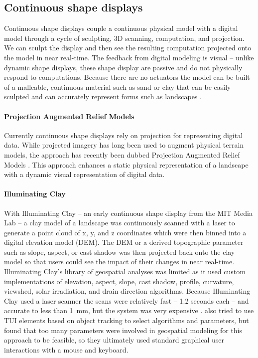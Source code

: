 \documentclass{article}
\begin{document}
%
\subsection{Continuous shape displays} 
Continuous shape displays couple a continuous physical model
with a digital model through a cycle of sculpting, 3D scanning, computation, and projection.
We can sculpt the display and then see the resulting computation projected onto the model
in near real-time. The feedback from digital modeling is visual -- unlike dynamic shape displays,
these shape display are passive and do not physically respond to computations.
Because there are no actuators the model can be built of a malleable, continuous material
such as sand or clay that can be easily sculpted and can accurately represent forms
such as landscapes \citep{Ishii2004, Ishii2008b}.

\paragraph{Projection Augmented Relief Models}
Currently continuous shape displays rely on projection for representing digital data. While projected imagery has long been used to augment physical terrain models, the approach has recently been dubbed Projection Augmented Relief Models \citep{Priestnall2012}. This approach enhances a static physical representation of a landscape with a dynamic visual representation of digital data. 

\paragraph{Illuminating Clay}
With Illuminating Clay \citep{Piper2002a} -- an early continuous shape display
from the MIT Media Lab -- a clay model of a landscape was continuously scanned
with a laser to generate a point cloud of x, y, and z coordinates
which were then binned into
a digital elevation model (DEM).
The DEM or a derived topographic parameter such as slope, aspect,
or cast shadow was then projected back onto the clay model so that users could see the impact of their changes in near real-time. Illuminating Clay's library of geospatial analyses was limited as it used custom implementations of elevation, aspect, slope, cast shadow, profile, curvature, viewshed, solar irradiation, and drain direction algorithms. Because Illuminating Clay used a laser scanner the scans were relatively fast -- 1.2 seconds each -- and accurate to less than 1~mm, but the system was very expensive \citep{Piper2002a, Piper2002b}.
\citet{Piper2002a} also tried to use TUI elements based on object tracking to select algorithms and parameters, but found that too many parameters were involved in geospatial modeling for this approach to be feasible, so they ultimately used standard graphical user interactions with a mouse and keyboard.  
\end{document}
